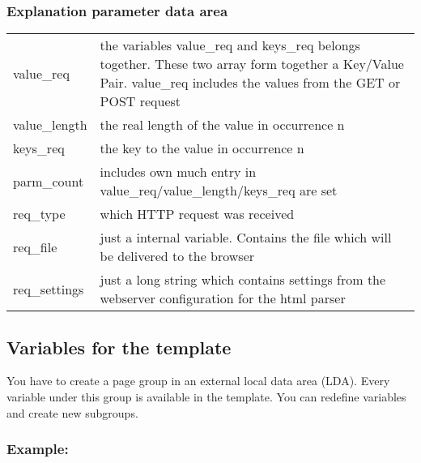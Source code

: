 \documentclass[letterpaper,10pt,english]{sphinxmanual}
\begin{document}
\subsubsection{Explanation parameter data area}
\label{\detokenize{natural:explanation-parameter-data-area}}
\noindent\begin{tabulary}{\linewidth}{|L|L|}
\hline
{}\relax &\relax \\
\hline
value\_req
&
the variables value\_req and keys\_req belongs together. These two array form together a Key/Value Pair. \sphinxquotedblleft{}value\_req\sphinxquotedblright{} includes the values from the GET or POST request
\\
\hline
value\_length
&
the real length of the value in occurrence n
\\
\hline
keys\_req
&
the key to the value in occurrence n
\\
\hline
parm\_count
&
includes own much entry in value\_req/value\_length/keys\_req are set
\\
\hline
req\_type
&
which HTTP request was received
\\
\hline
req\_file
&
just a internal variable. Contains the file which will be delivered to the browser
\\
\hline
req\_settings
&
just a long string which contains settings from the webserver configuration for the html parser
\\
\hline\end{tabulary}



\subsection{Variables for the template}
\label{\detokenize{natural:template-vars}}\label{\detokenize{natural:variables-for-the-template}}
You have to create a page group in an external local data area (LDA). Every variable under this group is available in the template. You can redefine variables and create new subgroups.


\subsubsection{Example:}
\label{\detokenize{natural:example}}
\begin{sphinxVerbatim}[commandchars=\\\{\}]
  
  
     
     
\end{sphinxVerbatim}
\end{document}
